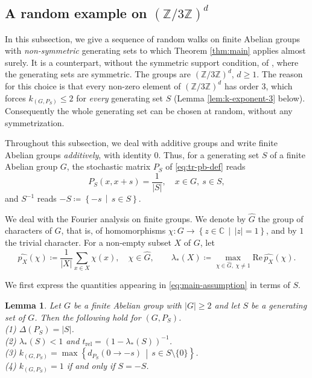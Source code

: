 \documentclass[a4paper, reqno, 11pt]{amsart}
\newtheorem{Lem}[Thm]{Lemma}
\theoremstyle{definition}
\begin{document}
\subsection{A random example on $(\mathbb{Z}/3\mathbb{Z})^{d}$}\label{subsec:random}

In this subsection, we give a sequence of random walks on finite Abelian groups with \emph{non-symmetric} generating sets to which Theorem \ref{thm:main} applies almost surely.
It is a counterpart, without the symmetric support condition, of \cite[Corollary 4]{Salez2024},
where the generating sets are symmetric.
The groups are $(\mathbb{Z}/3\mathbb{Z})^{d}$, $d \ge 1$.
The reason for this choice is that every non-zero element of $(\mathbb{Z}/3\mathbb{Z})^{d}$ has order $3$,
which forces $k_{(G, P_{S})} \le 2$ for \emph{every} generating set $S$ (Lemma \ref{lem:k-exponent-3} below).
Consequently the whole generating set can be chosen at random, without any symmetrization.

Throughout this subsection, we deal with additive groups and write finite Abelian groups {\it additively}, with identity $0$.
Thus, for a generating set $S$ of a finite Abelian group $G$, the stochastic matrix $P_{S}$ of \eqref{eq:tr-pb-def} reads
\[ P_{S}(x, x+s) = \frac{1}{|S|}, \quad x \in G,\ s \in S, \]
and $S^{-1}$ reads $-S \coloneqq \left\{-s \,\middle|\, s \in S\right\}$. 

We deal with the Fourier analysis on finite groups. 
We denote by $\widehat{G}$ the group of characters of $G$, that is, of homomorphisms $\chi \colon G \to \left\{z \in \mathbb{C} \,\middle|\, |z| = 1\right\}$,
and by $1$ the trivial character.
For a non-empty subset $X$ of $G$, let
\[ \widehat{p_{X}}(\chi) \coloneqq \frac{1}{|X|} \sum_{x \in X} \chi(x), \quad \chi \in \widehat{G}, \qquad
   \lambda_{*}(X) \coloneqq \max_{\chi \in \widehat{G},\ \chi \ne 1} \mathrm{Re}\, \widehat{p_{X}}(\chi). \]

We first express the quantities appearing in \eqref{eq:main-assumption} in terms of $S$.

\begin{Lem}\label{lem:cayley-spectral}
Let $G$ be a finite Abelian group with $|G| \ge 2$ and let $S$ be a generating set of $G$.
Then the following hold for $(G, P_{S})$.\\
(1) $\Delta(P_{S}) = |S|$.\\
(2) $\lambda_{*}(S) < 1$ and $t_{\mathrm{rel}} = \left(1 - \lambda_{*}(S)\right)^{-1}$.\\
(3) $k_{(G, P_{S})} = \max\left\{ d_{P_{S}}(0 \to -s) \,\middle|\, s \in S \setminus \{0\} \right\}$.\\
(4) $k_{(G, P_{S})} = 1$ if and only if $S = -S$.
\end{Lem}
\end{document}
